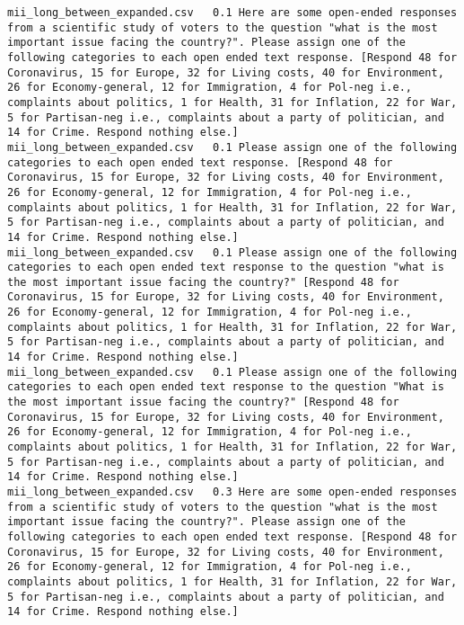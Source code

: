 \lstset{breaklines=true, breakatwhitespace=true}
\begin{lstlisting}[label=lst:promptvariants]
% Format: Dataset \t Temperature \t Prompt
mii_long_between_expanded.csv	0.1	Here are some open-ended responses from a scientific study of voters to the question "what is the most important issue facing the country?". Please assign one of the following categories to each open ended text response. [Respond 48 for Coronavirus, 15 for Europe, 32 for Living costs, 40 for Environment, 26 for Economy-general, 12 for Immigration, 4 for Pol-neg i.e., complaints about politics, 1 for Health, 31 for Inflation, 22 for War, 5 for Partisan-neg i.e., complaints about a party of politician, and 14 for Crime. Respond nothing else.]
mii_long_between_expanded.csv	0.1	Please assign one of the following categories to each open ended text response. [Respond 48 for Coronavirus, 15 for Europe, 32 for Living costs, 40 for Environment, 26 for Economy-general, 12 for Immigration, 4 for Pol-neg i.e., complaints about politics, 1 for Health, 31 for Inflation, 22 for War, 5 for Partisan-neg i.e., complaints about a party of politician, and 14 for Crime. Respond nothing else.]
mii_long_between_expanded.csv	0.1	Please assign one of the following categories to each open ended text response to the question "what is the most important issue facing the country?" [Respond 48 for Coronavirus, 15 for Europe, 32 for Living costs, 40 for Environment, 26 for Economy-general, 12 for Immigration, 4 for Pol-neg i.e., complaints about politics, 1 for Health, 31 for Inflation, 22 for War, 5 for Partisan-neg i.e., complaints about a party of politician, and 14 for Crime. Respond nothing else.]
mii_long_between_expanded.csv	0.1	Please assign one of the following categories to each open ended text response to the question "What is the most important issue facing the country?" [Respond 48 for Coronavirus, 15 for Europe, 32 for Living costs, 40 for Environment, 26 for Economy-general, 12 for Immigration, 4 for Pol-neg i.e., complaints about politics, 1 for Health, 31 for Inflation, 22 for War, 5 for Partisan-neg i.e., complaints about a party of politician, and 14 for Crime. Respond nothing else.]
mii_long_between_expanded.csv	0.3	Here are some open-ended responses from a scientific study of voters to the question "what is the most important issue facing the country?". Please assign one of the following categories to each open ended text response. [Respond 48 for Coronavirus, 15 for Europe, 32 for Living costs, 40 for Environment, 26 for Economy-general, 12 for Immigration, 4 for Pol-neg i.e., complaints about politics, 1 for Health, 31 for Inflation, 22 for War, 5 for Partisan-neg i.e., complaints about a party of politician, and 14 for Crime. Respond nothing else.]

\end{lstlisting}
